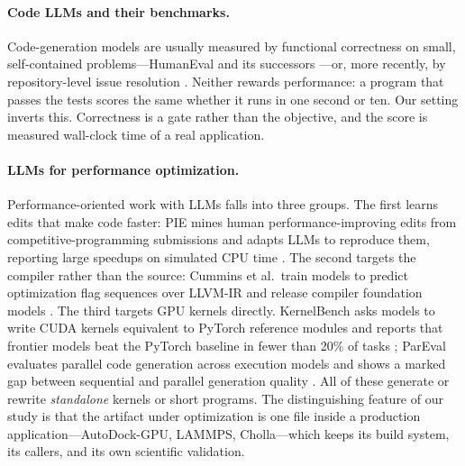 \paragraph{Code LLMs and their benchmarks.}
Code-generation models are usually measured by functional correctness on small, self-contained
problems---HumanEval and its successors \cite{chen2021codex}---or, more recently, by repository-level
issue resolution \cite{jimenez2024swebench}. Neither rewards performance: a program that passes the
tests scores the same whether it runs in one second or ten. Our setting inverts this. Correctness is a
gate rather than the objective, and the score is measured wall-clock time of a real application.

\paragraph{LLMs for performance optimization.}
Performance-oriented work with LLMs falls into three groups. The first learns edits that make code
faster: PIE mines human performance-improving edits from competitive-programming submissions and adapts
LLMs to reproduce them, reporting large speedups on simulated CPU time \cite{shypula2024pie}. The
second targets the compiler rather than the source: Cummins et al.\ train models to predict
optimization flag sequences over LLVM-IR \cite{cummins2023llmopt} and release compiler foundation
models \cite{cummins2024llmcompiler}. The third targets GPU kernels directly. KernelBench asks models
to write CUDA kernels equivalent to PyTorch reference modules and reports that frontier models beat the
PyTorch baseline in fewer than 20\% of tasks \cite{ouyang2025kernelbench}; ParEval evaluates parallel
code generation across execution models and shows a marked gap between sequential and parallel
generation quality \cite{nichols2024parallel}. All of these generate or rewrite \emph{standalone}
kernels or short programs. The distinguishing feature of our study is that the artifact under
optimization is one file inside a production application---AutoDock-GPU, LAMMPS, Cholla---which keeps
its build system, its callers, and its own scientific validation.

